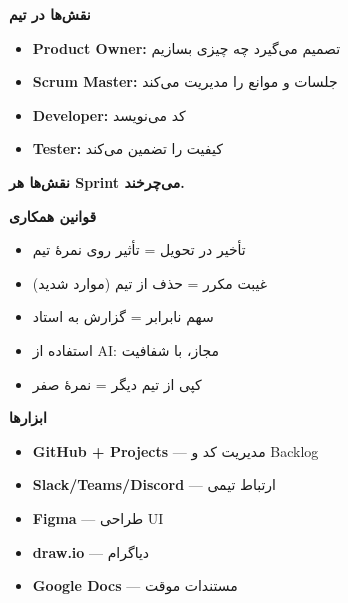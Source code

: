 \documentclass[14pt, a4paper, landscape]{extarticle}
\newcommand{\slide}[1]{%
    \newpage
    \begin{center}
    \begin{minipage}[t]{0.95\textwidth}
    \vspace{0.5cm}
    #1
    \vspace{0.5cm}
    \end{minipage}
    \end{center}
}
\newcommand{\slidetitle}[1]{%
    \begin{center}
        {\LARGE\bfseries\textcolor{primary}{#1}}
    \end{center}
    \vspace{0.5cm}
}
\begin{document}
\slide{
    \slidetitle{نقش‌ها در تیم}
    \vspace{0.5cm}
    \begin{itemize}[itemsep=0.6em]
        \item \textbf{Product Owner:} تصمیم می‌گیرد چه چیزی بسازیم
        \item \textbf{Scrum Master:} جلسات و موانع را مدیریت می‌کند
        \item \textbf{Developer:} کد می‌نویسد
        \item \textbf{Tester:} کیفیت را تضمین می‌کند
    \end{itemize}
    
    \vspace{1.5cm}
    
    \begin{center}
        {\bfseries نقش‌ها هر Sprint می‌چرخند.}
    \end{center}
}

\slide{
    \slidetitle{قوانین همکاری}
    \vspace{0.5cm}
    \begin{itemize}[itemsep=0.6em]
        \item تأخیر در تحویل = تأثیر روی نمرهٔ تیم
        \item غیبت مکرر = حذف از تیم (موارد شدید)
        \item سهم نابرابر = گزارش به استاد
        \item استفاده از AI: مجاز، با شفافیت
        \item کپی از تیم دیگر = نمرهٔ صفر
    \end{itemize}
}

\slide{
    \slidetitle{ابزارها}
    \vspace{0.5cm}
    \begin{itemize}[itemsep=0.6em]
        \item \textbf{GitHub + Projects} — مدیریت کد و Backlog
        \item \textbf{Slack/Teams/Discord} — ارتباط تیمی
        \item \textbf{Figma} — طراحی UI
        \item \textbf{draw.io} — دیاگرام
        \item \textbf{Google Docs} — مستندات موقت
    \end{itemize}
}
\end{document}
